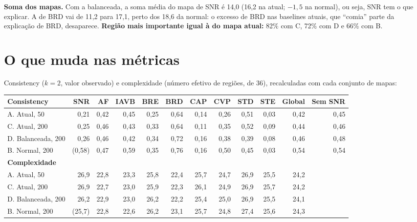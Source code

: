 \documentclass[11pt,a4paper]{article}
\begin{document}
\textbf{Soma dos mapas.} Com a balanceada, a soma média do mapa de SNR é 14,0 (16,2 na atual; $-1{,}5$ na normal), ou seja, SNR tem o que explicar. A de BRD vai de 11,2 para 17,1, perto dos 18,6 da normal: o excesso de BRD nas baselines atuais, que “comia” parte da explicação de BRD, desaparece. \textbf{Região mais importante igual à do mapa atual:} 82\% com C, 72\% com D e 66\% com B.

\section{O que muda nas métricas}
Consistency ($k = 2$, valor observado) e complexidade (número efetivo de regiões, de 36), recalculadas com cada conjunto de mapas:
\begin{center}\small
\setlength{\tabcolsep}{4pt}
\begin{tabular}{lrrrrrrrrrrr}
\toprule
\textbf{Consistency} & \textbf{SNR} & \textbf{AF} & \textbf{IAVB} & \textbf{BRE} & \textbf{BRD} & \textbf{CAP} & \textbf{CVP} & \textbf{STD} & \textbf{STE} & \textbf{Global} & \textbf{Sem SNR} \\
\midrule
A. Atual, 50 & 0,21 & 0,42 & 0,45 & 0,25 & 0,64 & 0,14 & 0,26 & 0,51 & 0,03 & 0,42 & 0,45 \\
C. Atual, 200 & 0,25 & 0,46 & 0,43 & 0,33 & 0,64 & 0,11 & 0,35 & 0,52 & 0,09 & 0,44 & 0,46 \\
D. Balanceada, 200 & 0,26 & 0,46 & 0,42 & 0,34 & 0,72 & 0,16 & 0,38 & 0,39 & 0,08 & 0,46 & 0,48 \\
B. Normal, 200 & (0,58) & 0,47 & 0,59 & 0,35 & 0,76 & 0,16 & 0,50 & 0,45 & 0,03 & 0,54 & 0,54 \\
\midrule
\textbf{Complexidade} & & & & & & & & & & & \\
A. Atual, 50 & 26,9 & 22,8 & 23,3 & 25,8 & 22,4 & 25,7 & 24,7 & 26,9 & 25,5 & 24,2 & \\
C. Atual, 200 & 26,9 & 22,7 & 23,0 & 25,9 & 22,3 & 26,1 & 24,9 & 26,9 & 25,7 & 24,2 & \\
D. Balanceada, 200 & 26,2 & 22,9 & 23,0 & 26,2 & 22,2 & 25,4 & 25,0 & 26,9 & 25,5 & 24,1 & \\
B. Normal, 200 & (25,7) & 22,8 & 22,6 & 26,2 & 23,1 & 25,7 & 24,8 & 27,4 & 25,6 & 24,3 & \\
\bottomrule
\end{tabular}
\end{center}
\end{document}
